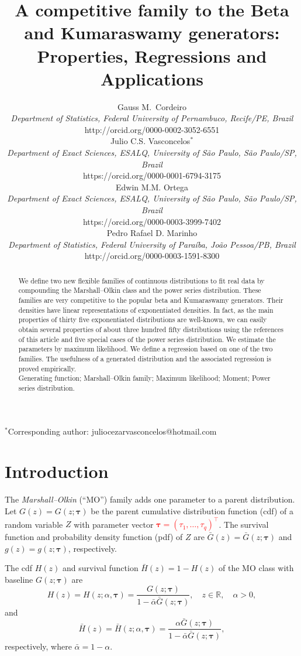\documentclass[12pt]{article}
\title{A competitive family to the Beta and Kumaraswamy generators: Properties, Regressions and Applications}
\author{Gauss M.~Cordeiro\\
{\small {\em Department of Statistics, Federal University of Pernambuco, Recife/PE, Brazil}}\\
http://orcid.org/0000-0002-3052-6551\\	
Julio C.S. Vasconcelos$^{*}$\\
{\small {\em Department of Exact Sciences, ESALQ, University of S\~ao Paulo, S\~ao Paulo/SP, Brazil}}\\
https://orcid.org/0000-0001-6794-3175\\
Edwin M.M. Ortega\\
{\small {\em Department of Exact Sciences, ESALQ, University of S\~ao Paulo, S\~ao Paulo/SP, Brazil}}\\
https://orcid.org/0000-0003-3999-7402\\
Pedro Rafael D. Marinho\\
{\small {\em Department of Statistics, Federal University of Paraíba, João Pessoa/PB, Brazil}}\\
http://orcid.org/0000-0003-1591-8300\\	
}
\date{}
\newcommand{\Reais}{\mathbb{R}}
\begin{document}
\maketitle
$^{*}$Corresponding author: juliocezarvasconcelos@hotmail.com

\begin{abstract}

We define two new flexible families of continuous distributions to fit real data by
compoun\-ding the Marshall--Olkin class \citep{MarshallOlkin1997} and the power series distribution.
These families are very competitive to the popular beta and Kumaraswamy generators. Their densities have
linear representations of exponentiated densities. In fact, as the main properties of thirty five exponentiated distributions \citep{Tahir2015}
are well-known, we can easily obtain several properties of about three hundred fifty distributions using the references of this article
and five special cases of the power series distribution. We estimate the parameters by maximum likelihood. We define a regression
based on one of the two families. The usefulness of a generated distribution and the
associated regression is proved empirically.\\

 Generating function; Marshall--Olkin family; Maximum likelihood; Moment; Power series
distribution.
\end{abstract}

\section{Introduction}\label{introduction}


The {\it Marshall--Olkin} (``MO'') family \citep{MarshallOlkin1997} adds one parameter to a parent distribution.
Let $G(z)=G(z;\bm{\tau})$ be the parent cumulative distribution function (cdf) of a random variable $Z$ with parameter
vector \textcolor{red}{$\bm{\tau}=(\tau_{1},\ldots,\tau_{q})^\top$}. The survival function and probability density function (pdf) of $Z$
are $\bar{G}(z)=\bar{G}(z;\bm{\tau})$ and $g(z)=g(z;\bm{\tau})$, respectively.

The cdf $H(z)$ and survival function $\bar{H}(z)=1-H(z)$ of the MO class with baseline $G(z;\bm{\tau})$ are
\begin{equation}\label{cdf_G}
H(z)=H(z;\alpha,\bm{\tau})=\frac{G(z;\bm{\tau})}{1-\bar{\alpha}\bar{G}(z;\bm{\tau})},\quad  z\in\Reais,\quad \alpha>0,
\end{equation}
and
\begin{equation}\label{survivor_G}
\bar{H}(z)=\bar{H}(z;\alpha,\bm{\tau})=\frac{\alpha\bar{G}(z;\bm{\tau})}{1-\bar{\alpha}\bar{G}(z;\bm{\tau})},
\end{equation}
respectively, where $\bar{\alpha}=1-\alpha$.
\end{document}
